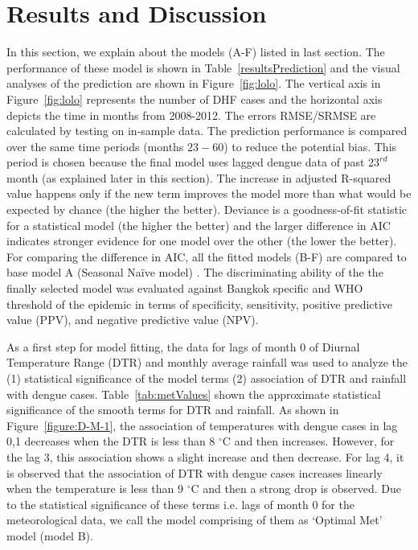 \documentclass{bmcart}
\begin{document}
\section{Results and Discussion} \label{results}


In this section, we explain about the models (A-F) listed in last section. The performance of these model is shown in Table~\ref{resultsPrediction} and the visual analyses of the prediction are shown in Figure~\ref{fig:lolo}. The vertical axis in Figure~\ref{fig:lolo} represents the number of DHF cases and the horizontal axis depicts the time in months from 2008-2012. The errors RMSE/SRMSE are calculated by testing on in-sample data. The prediction performance is compared over the same time periods (months $23-60$) to reduce the potential bias. This period is chosen because the final model uses lagged dengue data of past  $23^{rd}$ month (as explained later in this section). The increase in adjusted R-squared value happens only if the new term improves the model more than what would be expected by chance (the higher the better). Deviance is a goodness-of-fit statistic for a statistical model (the higher the better) and the larger difference in AIC indicates stronger evidence for one model over the other (the lower the better). For comparing  the difference in AIC, all the fitted models (B-F) are compared to base model A (Seasonal Na\"{i}ve model) .  The discriminating ability of the the finally selected model was evaluated against Bangkok specific and WHO threshold of the epidemic in terms of specificity, sensitivity, positive predictive value (PPV), and negative predictive value (NPV).



As a first step for model fitting, the data for lags of month 0 of Diurnal Temperature Range (DTR) and monthly average rainfall was used to analyze the (1) statistical significance of the model terms (2) association of DTR and rainfall with dengue cases. Table~\ref{tab:metValues} shown the approximate statistical significance of the smooth terms for DTR and rainfall. As shown in Figure~\ref{figure:D-M-1}, the association of temperatures with dengue cases in lag 0,1 decreases when the DTR is less than 8 $^{\circ}$C and then increases. However, for the lag 3, this association shows a slight increase and then decrease. For lag 4, it is observed that the association of DTR with dengue cases increases linearly when the temperature is less than 9 $^{\circ}$C  and then a strong drop is observed. Due to the statistical significance of these terms i.e. lags of month 0 for the meteorological data, we call the model comprising of them as `Optimal Met' model (model B). 
\end{document}
